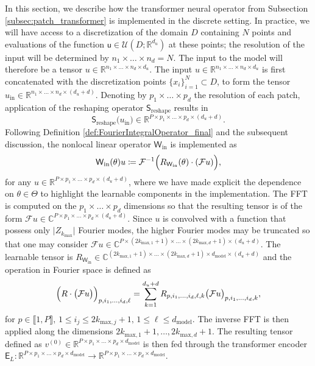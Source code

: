 \documentclass[twoside]{article}
\newcommand{\1}{\mathbbm{1}}
\newcommand{\R}{\mathbbm{R}}
\newcommand{\C}{\mathbbm{C}}
\newcommand{\cU}{\mathcal{U}}
\newcommand{\sQ}{\mathsf{Q}}
\newcommand{\sK}{\mathsf{K}}
\newcommand{\sE}{\mathsf{E}}
\newcommand{\sS}{\mathsf{S}}
\newcommand{\su}{\mathsf{u}}
\newcommand{\sV}{\mathsf{V}}
\newcommand{\sW}{\mathsf{W}}
\newcommand{\cF}{\mathcal{F}}
\newcommand{\range}[2]{\llbracket #1, #2 \rrbracket}
\providecommand{\mathbbm}{\mathbb} %
\begin{document}
In this section, we describe how the transformer neural operator from Subsection \ref{subsec:patch_transformer} is implemented in the discrete setting. In practice, we will have access to a discretization of the domain $D$ containing $N$ points and evaluations of the function $\su\in \cU(D;\R^{d_u})$ at these points; the resolution of the input will be determined by $n_1\times\ldots\times n_d=N$. The input to the model will therefore be a tensor $u\in \R^{n_1\times\ldots\times n_d\times d_u}$. The input $u\in \R^{n_1\times\ldots\times n_d\times d_u}$ is first concatenated with the discretization points $\{x_i\}_{i=1}^N\subset D$, to form the tensor $u_{\textrm{in}}\in \R^{n_1\times\ldots\times n_d\times (d_u+d)}$. Denoting by $p_1\times\ldots\times p_d$ the resolution of each patch, application of the reshaping operator $\sS_{\textrm{reshape}}$ results in
$$\sS_{\textrm{reshape}}\bigl(u_{\textrm{in}} \bigr)\in \R^{P\times p_1 \times\ldots\times p_d \times (d_u+d)}.$$
Following Definition \ref{def:FourierIntegralOperator_final} and the subsequent discussion, the nonlocal linear operator $\sW_{\textrm{in}}$ is implemented as
\begin{equation}
\label{eq:int_discrete}
    \sW_{\textrm{in}}(\theta){{u}} \coloneqq \cF^{-1}\Bigl(R_{\sW_{\textrm{in}}}(\theta) \cdot (\cF{u}) \Bigr),
\end{equation}
for any $u\in \R^{P\times p_1 \times\ldots\times p_d \times (d_u+d)}$, where we have made explicit the dependence on $\theta \in\Theta$ to highlight the learnable components in the implementation. The FFT is computed on the $p_1\times\ldots\times p_d$ dimensions so that the resulting tensor is of the form $\cF{u}\in\C^{P\times p_1\times\ldots\times p_d\times (d_u+d)}$. Since ${u}$ is convolved with a function that possess only  $\bigl|Z_{k_{\textrm{max}}} \bigr|$ Fourier modes, the higher Fourier modes may be truncated so that one may consider $\cF{u}\in\C^{P\times (2k_{\textrm{max},1}+1)\times\ldots\times (2k_{\textrm{max},d}+1)\times (d_u+d)}$. The learnable tensor is $R_{\sW_{\textrm{in}}}\in\C^{(2k_{\textrm{max},1}+1)\times\ldots\times (2k_{\textrm{max},d}+1)\times d_{\textrm{model}}\times (d_u+d)}$ and the operation in Fourier space is defined as
\begin{equation}
\label{eq:frequency_comp}    \Bigl(R\cdot\bigl(\cF{u}\bigr) \Bigr)_{p,i_1,\ldots,i_d, \ell} = \sum_{k=1}^{d_u+d} R_{p,i_1,\ldots,i_d, \ell,k} \bigl(\cF{u} \bigr)_{p,i_1,\ldots,i_d, k}       ,
\end{equation}
for $p\in\range{1}{P}, \,1\leq i_j\leq 2k_{\textrm{max},j}+1,\, 1\leq \ell\leq d_{\textrm{model}} $. %
The inverse FFT is then applied along the dimensions $2k_{\textrm{max},1}+1,\ldots, 2k_{\textrm{max},d}+1$. The resulting tensor defined as ${v}^{(0)}\in \R^{{P\times p_1\times \ldots\times p_d\times d_{\textrm{model}}}}$ is then fed through the transformer encoder $\sE_L:\R^{{P\times p_1\times \ldots\times p_d\times d_{\textrm{model}}}}\to\R^{{P\times p_1\times \ldots\times p_d\times d_{\textrm{model}}}}$.
\end{document}
